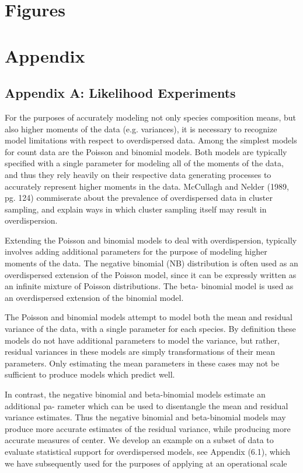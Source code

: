 \documentclass[12pt]{article}
\begin{document}
\section{Figures}
%
%

%
%
\section{Appendix}\label{appendix}
%
%

%
\subsection{Appendix A: Likelihood Experiments}\label{likelihoodAppendix}

%
For the purposes of accurately modeling not only species composition means, 
but also higher moments of the data (e.g. variances), it is necessary to 
recognize model limitations with respect to overdispersed data. Among the 
simplest models for count data are the Poisson and binomial models. Both 
models are typically specified with a single parameter for modeling all of the 
moments of the data, and thus they rely heavily on their respective data 
generating processes to accurately represent higher moments in the data. 
McCullagh and Nelder (1989, pg. 124) commiserate about the prevalence of 
overdispersed data in cluster sampling, and explain ways in which cluster 
sampling itself may result in overdispersion.  

%
Extending the Poisson and binomial models to deal with overdispersion, 
typically involves adding additional parameters for the purpose of modeling 
higher moments of the data. The negative binomial (NB) distribution is often 
used as an overdispersed extension of the Poisson model, since it can be 
expressly written as an infinite mixture of Poisson distributions. The beta-
binomial model is used as an overdispersed extension of the binomial model.  

%
The Poisson and binomial models attempt to model both the mean and residual 
variance of the data, with a single parameter for each species. By definition 
these models do not have additional parameters to model the variance, but 
rather, residual variances in these models are simply transformations of their 
mean parameters. Only estimating the mean parameters in these cases may not be 
sufficient to produce models which predict well.

%
In contrast, the negative binomial and beta-binomial models estimate an 
additional pa- rameter which can be used to disentangle the mean and residual 
variance estimates. Thus the negative binomial and beta-binomial models may 
produce more accurate estimates of the residual variance, while producing more 
accurate measures of center. We develop an example on a subset of data to 
evaluate statistical support for overdispersed models, see Appendix (6.1), which we have subsequently used for the purposes of applying at an operational scale 
\end{document}
